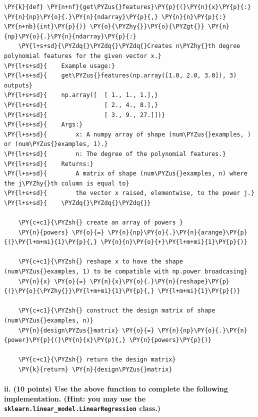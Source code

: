 \documentclass[a4paper,11pt]{article}%
\begin{document}
    \begin{tcolorbox}[breakable, size=fbox, boxrule=1pt, pad at break*=1mm,colback=cellbackground, colframe=cellborder]
\begin{Verbatim}[commandchars=\\\{\}]
\PY{k}{def} \PY{n+nf}{get\PYZus{}features}\PY{p}{(}\PY{n}{x}\PY{p}{:} \PY{n}{np}\PY{o}{.}\PY{n}{ndarray}\PY{p}{,} \PY{n}{n}\PY{p}{:} \PY{n+nb}{int}\PY{p}{)} \PY{o}{\PYZhy{}}\PY{o}{\PYZgt{}} \PY{n}{np}\PY{o}{.}\PY{n}{ndarray}\PY{p}{:}
    \PY{l+s+sd}{\PYZdq{}\PYZdq{}\PYZdq{}Creates n\PYZhy{}th degree polynomial features for the given vector x.}
\PY{l+s+sd}{    Example usage:}
\PY{l+s+sd}{    get\PYZus{}features(np.array([1.0, 2.0, 3.0]), 3) outputs}
\PY{l+s+sd}{    np.array([  [ 1., 1., 1.],}
\PY{l+s+sd}{                [ 2., 4., 8.],}
\PY{l+s+sd}{                [ 3., 9., 27.]])}
\PY{l+s+sd}{    Args:}
\PY{l+s+sd}{        x: A numpy array of shape (num\PYZus{}examples, ) or (num\PYZus{}examples, 1).}
\PY{l+s+sd}{        n: The degree of the polynomial features.}
\PY{l+s+sd}{    Returns:}
\PY{l+s+sd}{        A matrix of shape (num\PYZus{}examples, n) where the j\PYZhy{}th column is equal to}
\PY{l+s+sd}{        the vector x raised, elementwise, to the power j.}
\PY{l+s+sd}{    \PYZdq{}\PYZdq{}\PYZdq{}}
    
    \PY{c+c1}{\PYZsh{} create an array of powers }
    \PY{n}{powers} \PY{o}{=} \PY{n}{np}\PY{o}{.}\PY{n}{arange}\PY{p}{(}\PY{l+m+mi}{1}\PY{p}{,} \PY{n}{n}\PY{o}{+}\PY{l+m+mi}{1}\PY{p}{)}

    \PY{c+c1}{\PYZsh{} reshape x to have the shape (num\PYZus{}examples, 1) to be compatible with np.power broadcasing}
    \PY{n}{x} \PY{o}{=} \PY{n}{x}\PY{o}{.}\PY{n}{reshape}\PY{p}{(}\PY{o}{\PYZhy{}}\PY{l+m+mi}{1}\PY{p}{,} \PY{l+m+mi}{1}\PY{p}{)}

    \PY{c+c1}{\PYZsh{} construct the design matrix of shape (num\PYZus{}examples, n)}
    \PY{n}{design\PYZus{}matrix} \PY{o}{=} \PY{n}{np}\PY{o}{.}\PY{n}{power}\PY{p}{(}\PY{n}{x}\PY{p}{,} \PY{n}{powers}\PY{p}{)}

    \PY{c+c1}{\PYZsh{} return the design matrix}
    \PY{k}{return} \PY{n}{design\PYZus{}matrix}
\end{Verbatim}
\end{tcolorbox}

    \hypertarget{ii.-10-points-use-the-above-function-to-complete-the-following-implementation.-hint-you-may-use-the-sklearn.linear_model.linearregression-class.}{%
\pagebreak
\paragraph{\texorpdfstring{ii. (10 points) Use the above function to
complete the following implementation. (Hint: you may use the
\texttt{sklearn.linear\_model.LinearRegression}
class.)}{ii. (10 points) Use the above function to complete the following implementation. (Hint: you may use the sklearn.linear\_model.LinearRegression class.)}} \label{ii.-10-points-use-the-above-function-to-complete-the-following-implementation.-hint-you-may-use-the-sklearn.linear_model.linearregression-class.}}
\end{document}
